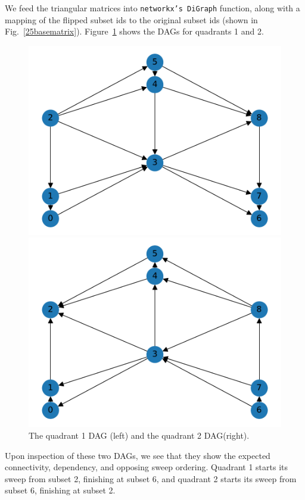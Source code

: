 We feed the triangular matrices into {\tt networkx's DiGraph} function, along with a mapping of the flipped subset ids to the original subset ids (shown in Fig.~\ref{25basematrix}). Figure~\ref{25_q1q2graphs} shows the DAGs for quadrants 1 and 2.
\begin{figure}[H]
\begin{minipage}[c]{0.5\textwidth}
\includegraphics[scale=0.5]{../../figures/9_graph1.pdf}
\end{minipage}
\begin{minipage}[c]{0.5\textwidth}
\includegraphics[scale=0.5]{../../figures/9_graph2.pdf}
\end{minipage}
\caption{The quadrant 1 DAG (left) and the quadrant 2 DAG(right).}
\label{25_q1q2graphs}
\end{figure}
Upon inspection of these two DAGs, we see that they show the expected connectivity, dependency, and opposing sweep ordering.
Quadrant 1 starts its sweep from subset 2, finishing at subset 6, and quadrant 2 starts its sweep from subset 6, finishing at subset 2.

